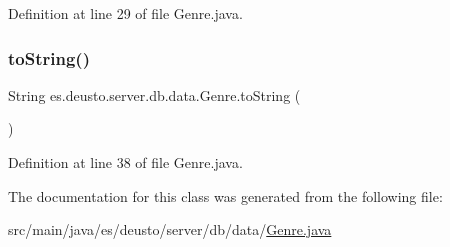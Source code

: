 Definition at line 29 of file Genre.\+java.

\mbox{\label{classes_1_1deusto_1_1server_1_1db_1_1data_1_1_genre_aeff531adb16e15f04a2f1a11b2b44af4}} 
\subsubsection{\texorpdfstring{to\+String()}{toString()}}
{\footnotesize\ttfamily String es.\+deusto.\+server.\+db.\+data.\+Genre.\+to\+String (\begin{DoxyParamCaption}{ }\end{DoxyParamCaption})}



Definition at line 38 of file Genre.\+java.



The documentation for this class was generated from the following file\+:\begin{DoxyCompactItemize}
\item 
src/main/java/es/deusto/server/db/data/\hyperlink{_genre_8java}{Genre.\+java}\end{DoxyCompactItemize}
